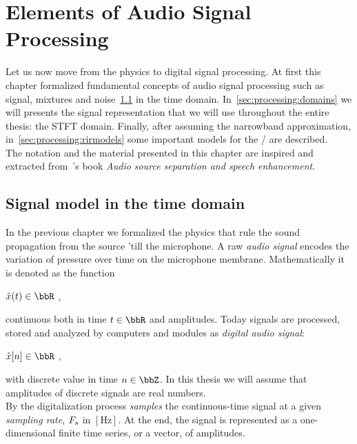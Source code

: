 \chapter{Elements of Audio Signal Processing}\label{ch:processing}
\vspace{-2.5em}
 Let us now move from the physics to digital signal processing.
At first this chapter formalized fundamental concepts of audio signal processing such as signal, mixtures and noise~\cref{sec:processing:model} in the time domain.
In~\cref{sec:processing:domains} we will presents the signal representation that we will use throughout the entire thesis: the STFT domain.
Finally, after assuming the narrowband approximation, in~\cref{sec:processing:rirmodels} some important models for the \RIR/ are described.
\\The notation and the material presented in this chapter are inspired and extracted from~\citeauthor{vincent2018audio}'s book \textit{Audio source separation and speech enhancement}.

\section{Signal model in the time domain}\label{sec:processing:model}
In the previous chapter we formalized the physics that rule the sound propagation from the source 'till the microphone.
A raw \textit{audio signal} encodes the variation of pressure over time on the microphone membrane.
Mathematically it is denoted as the function
\begin{center}
    $\contTime[\idxTime]{\mic} \in \R$
    ,
\end{center}
continuous both in time $t \in \R$ and amplitudes.
Today signals are processed, stored and analyzed by computers and modules as \textit{digital audio signal}:
\begin{center}
    $\discTime[\idxSample]{\mic} \in \R$
    ,
\end{center}
with discrete value in time $n \in \Z$.
In this thesis we will assume that amplitudes of discrete signals are real numbers.
\\By the digitalization process \textit{samples} the continuous-time signal
 at a given \textit{sampling rate},  $F_s$ in $[\si{\Hz}]$.
At the end, the signal is represented as a one-dimensional finite time series, or a vector, of amplitudes.

